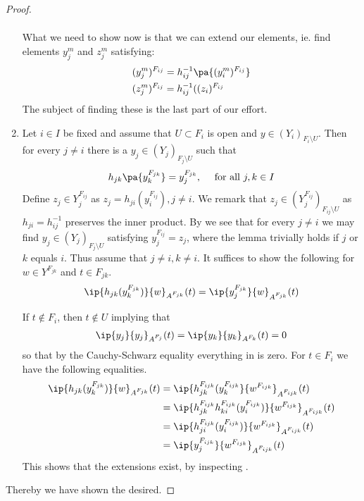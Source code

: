 \begin{proof}
\begin{enumerate}
\begin{align*}
	\end{align*}
	What we need to show now is that we can extend our elements, ie. find elements $y_j^m$ and $z_j^m$ satisfying: 
\begin{align*}
	&(y_j^m)^{F_{ij}}=h^{-1}_{ij}\pa{(y_i^m)^{F_{ij}}} \\
	&(z_j^m)^{F_{ij}}=h_{ij}^{-1}((z_i)^{F_{ij}}
\end{align*}
The subject of finding these is the last part of our effort. 
\item 
	Let $i\in I$ be fixed and assume that $U\subset F_i$ is open and $y\in (Y_i)_{F_{i}\setminus U}$. Then for every $j\neq i$ there is a $y_j\in (Y_{j})_{F_j\setminus U}$ such that 
	\begin{align*}
		h_{jk}\pa{y_k^{F_{jk}}}=y_j^{F_{jk}}, \quad \text{ for all }j,k\in I
	\end{align*}
	Define $z_j\in Y_j^{F_{ij}}$ as $z_j=h_{ji}(y_i^{F_{ij}}),j\neq i$. We remark that $z_j\in (Y_j^{F_{ij}})_{F_{ij}\setminus U}$ as $h_{ji}=h_{ij}^{-1}$ preserves the  inner product. By  we see that for every $j\neq i$ we may find $y_j\in (Y_j)_{F_j\setminus U}$ satisfying $y_j^{F_{ij}}=z_j$, where the lemma trivially holds if $j$ or $k$ equals $i$. Thus assume that $j\neq i,k\neq i$. It suffices to show the following for $w\in Y^{F_{jk}}$ and $t\in F_{jk}$. 
	\begin{align}\label{picardeq}
		\ip{h_{jk}(y_k^{F_{jk}})}{w}_{A^{F_{jk}}}(t)=\ip{y_j^{F_{jk}}}{w}_{A^{F_{jk}}}(t)
	\end{align} 

	If $t\nin F_i$, then $t\nin U$ implying that 
	\begin{align*}
		\ip{y_j}{y_j}_{A^{F_j}}(t)=\ip{y_k}{y_k}_{A^{F_k}}(t)=0
	\end{align*}
	so that by the Cauchy-Schwarz equality everything in  is zero.
	For $t\in F_i$ we have the following equalities. 
	\begin{align*}
		\ip{h_{jk}(y_k^{F_{jk}})}{w}_{A^{F_{jk}}}(t)&=\ip{h_{jk}^{F_{ijk}}(y_k^{F_{ijk}}}{w^{F_{ijk}}}_{A^{F_{ijk}}}(t) \\
		&=\ip{h_{jk}^{F_{ijk}}h_{ki}^{F_{ijk}}(y_i^{F_{ijk}})}{w^{F_{ijk}}}_{A^{F_{ijk}}}(t) \\
		&=\ip{h_{ji}^{F_{ijk}}(y_i^{F_{ijk}})}{w^{F_{ijk}}}_{A^{F_{ijk}}}(t) \\
		&=\ip{y_j^{F_{ijk}}}{w^{F_{ijk}}}_{A^{F_{ijk}}}(t)
	\end{align*}
	This shows that the extensions exist, by inspecting . 
\end{enumerate}
Thereby we have shown the desired. 
\end{proof}
